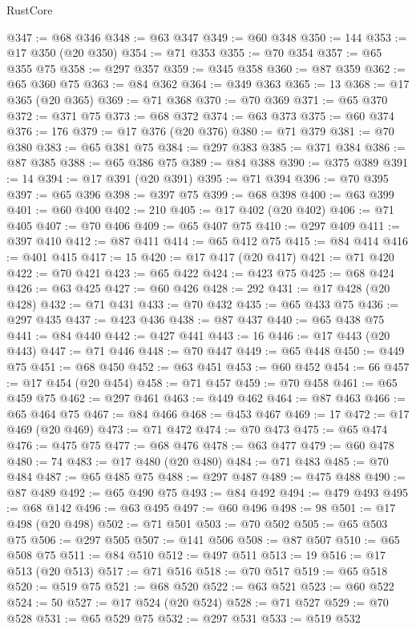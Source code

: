 \begin{lexlean}{RustCore}
\begin{coremodule}
@347 := @68 @346
@348 := @63 @347
@349 := @60 @348
@350 := 144
@353 := @17 @350 (@20 @350)
@354 := @71 @353
@355 := @70 @354
@357 := @65 @355 @75
@358 := @297 @357
@359 := @345 @358
@360 := @87 @359
@362 := @65 @360 @75
@363 := @84 @362
@364 := @349 @363
@365 := 13
@368 := @17 @365 (@20 @365)
@369 := @71 @368
@370 := @70 @369
@371 := @65 @370
@372 := @371 @75
@373 := @68 @372
@374 := @63 @373
@375 := @60 @374
@376 := 176
@379 := @17 @376 (@20 @376)
@380 := @71 @379
@381 := @70 @380
@383 := @65 @381 @75
@384 := @297 @383
@385 := @371 @384
@386 := @87 @385
@388 := @65 @386 @75
@389 := @84 @388
@390 := @375 @389
@391 := 14
@394 := @17 @391 (@20 @391)
@395 := @71 @394
@396 := @70 @395
@397 := @65 @396
@398 := @397 @75
@399 := @68 @398
@400 := @63 @399
@401 := @60 @400
@402 := 210
@405 := @17 @402 (@20 @402)
@406 := @71 @405
@407 := @70 @406
@409 := @65 @407 @75
@410 := @297 @409
@411 := @397 @410
@412 := @87 @411
@414 := @65 @412 @75
@415 := @84 @414
@416 := @401 @415
@417 := 15
@420 := @17 @417 (@20 @417)
@421 := @71 @420
@422 := @70 @421
@423 := @65 @422
@424 := @423 @75
@425 := @68 @424
@426 := @63 @425
@427 := @60 @426
@428 := 292
@431 := @17 @428 (@20 @428)
@432 := @71 @431
@433 := @70 @432
@435 := @65 @433 @75
@436 := @297 @435
@437 := @423 @436
@438 := @87 @437
@440 := @65 @438 @75
@441 := @84 @440
@442 := @427 @441
@443 := 16
@446 := @17 @443 (@20 @443)
@447 := @71 @446
@448 := @70 @447
@449 := @65 @448
@450 := @449 @75
@451 := @68 @450
@452 := @63 @451
@453 := @60 @452
@454 := 66
@457 := @17 @454 (@20 @454)
@458 := @71 @457
@459 := @70 @458
@461 := @65 @459 @75
@462 := @297 @461
@463 := @449 @462
@464 := @87 @463
@466 := @65 @464 @75
@467 := @84 @466
@468 := @453 @467
@469 := 17
@472 := @17 @469 (@20 @469)
@473 := @71 @472
@474 := @70 @473
@475 := @65 @474
@476 := @475 @75
@477 := @68 @476
@478 := @63 @477
@479 := @60 @478
@480 := 74
@483 := @17 @480 (@20 @480)
@484 := @71 @483
@485 := @70 @484
@487 := @65 @485 @75
@488 := @297 @487
@489 := @475 @488
@490 := @87 @489
@492 := @65 @490 @75
@493 := @84 @492
@494 := @479 @493
@495 := @68 @142
@496 := @63 @495
@497 := @60 @496
@498 := 98
@501 := @17 @498 (@20 @498)
@502 := @71 @501
@503 := @70 @502
@505 := @65 @503 @75
@506 := @297 @505
@507 := @141 @506
@508 := @87 @507
@510 := @65 @508 @75
@511 := @84 @510
@512 := @497 @511
@513 := 19
@516 := @17 @513 (@20 @513)
@517 := @71 @516
@518 := @70 @517
@519 := @65 @518
@520 := @519 @75
@521 := @68 @520
@522 := @63 @521
@523 := @60 @522
@524 := 50
@527 := @17 @524 (@20 @524)
@528 := @71 @527
@529 := @70 @528
@531 := @65 @529 @75
@532 := @297 @531
@533 := @519 @532

\end{coremodule}
\end{lexlean}
